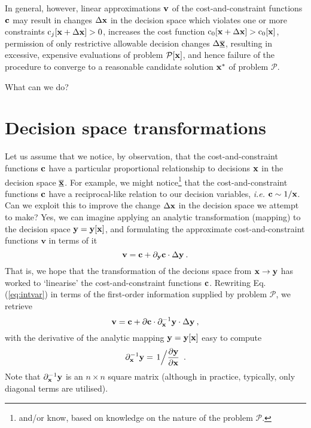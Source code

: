 \documentclass[11pt]{article}
\begin{document}
In general, however, linear approximations $\mathbf{v}$ of the cost-and-constraint functions $\mathbf{c}$ may result in changes $\Delta \mathbf{x}$ in the decision space which violates one or more constraints $\textrm{c}_j[\mathbf{x} + \Delta \mathbf{x}] > 0$, increases the cost function $\textrm{c}_0[\mathbf{x} + \Delta \mathbf{x}] > \textrm{c}_0[\mathbf{x}]$, permission of only restrictive allowable decision changes $\Delta \underline{\overline{\mathbf{x}}}$, resulting in excessive, expensive evaluations of problem $\mathcal{P}[\mathbf{x}]$, and hence failure of the procedure to converge to a reasonable candidate solution $\mathbf{x}^\ast$ of problem $\mathcal{P}$.

What can we do?

\section{Decision space transformations}

Let us assume that we notice, by observation, that the cost-and-constraint functions $\mathbf{c}$ have a particular proportional relationship to decisions $\mathbf{x}$ in the decision space $\underline{\overline{\mathbf{x}}}$. For example, we might notice\footnote{and/or know, based on knowledge on the nature of the problem $\mathcal{P}$.} that the cost-and-constraint functions $\mathbf{c}$ have a reciprocal-like relation to our decision variables, \emph{i.e.} $\mathbf{c} \sim 1/\mathbf{x}$. Can we exploit this to improve the change $\Delta \mathbf{x}$ in the decision space we attempt to make? Yes, we can imagine applying an analytic transformation (mapping) to the decision space $\mathbf{y} = \mathbf{y}[\mathbf{x}]$, and formulating the approximate cost-and-constraint functions $\textbf{v}$ in terms of it
\begin{equation}
\label{eq:intvar}
    \textbf{v} = \mathbf{c} +   \partial_{\mathbf{y}} \mathbf{c} \cdot \Delta \mathbf{y} \:.
\end{equation}
That is, we hope that the transformation of the decions space from $\mathbf{x} \to \mathbf{y}$ has worked to `linearise' the cost-and-constraint functions $\mathbf{c}$. Rewriting Eq. (\ref{eq:intvar}) in terms of the first-order information supplied by problem $\mathcal{P}$, we retrieve
\begin{equation}
    \textbf{v} = \mathbf{c} + \partial \mathbf{c} \cdot \partial_{\mathbf{x}}^{-1} \mathbf{y} \cdot  \Delta \mathbf{y}    \:,
\end{equation}
with the derivative of the analytic mapping $\mathbf{y} = \mathbf{y}[\mathbf{x}]$ easy to compute
\begin{equation}
    \partial_{\mathbf{x}}^{-1} \mathbf{y} = \left. 1 \Big/ \frac{\partial \mathbf{y}}{\partial \mathbf{x}}\right. \: .
\end{equation}
Note that  $\partial_{\mathbf{x}}^{-1}\mathbf{y}$ is an $n \times n$ square matrix (although in practice, typically, only diagonal terms are utilised).
\end{document}
